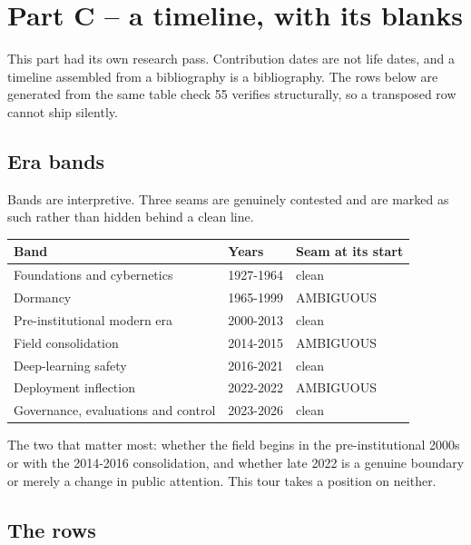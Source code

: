 \chapter*{Part C -- a timeline, with its blanks}

This part had its own research pass. Contribution dates are not life dates, and a timeline assembled from a bibliography is a bibliography. The rows below are generated from the same table check 55 verifies structurally, so a transposed row cannot ship silently.

\section*{Era bands}

Bands are interpretive. Three seams are genuinely contested and are marked as such rather than hidden behind a clean line.

\noindent

\noindent
\begin{tabularx}{\textwidth}{XXX}
\toprule
Band & Years & Seam at its start \\
\midrule
Foundations and cybernetics & 1927-1964 & clean \\
Dormancy & 1965-1999 & AMBIGUOUS \\
Pre-institutional modern era & 2000-2013 & clean \\
Field consolidation & 2014-2015 & AMBIGUOUS \\
Deep-learning safety & 2016-2021 & clean \\
Deployment inflection & 2022-2022 & AMBIGUOUS \\
Governance, evaluations and control & 2023-2026 & clean \\
\bottomrule
\end{tabularx}
\par\medskip

The two that matter most: whether the field begins in the pre-institutional 2000s or with the 2014-2016 consolidation, and whether late 2022 is a genuine boundary or merely a change in public attention. This tour takes a position on neither.

\section*{The rows}

